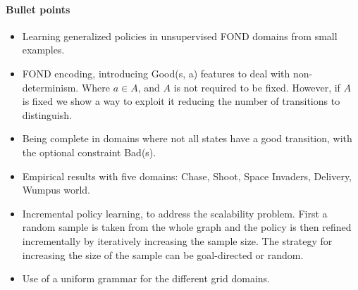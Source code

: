 \documentclass[a4paper]{article}
\begin{document}
\paragraph{Bullet points}
\begin{itemize}
\item Learning generalized policies in unsupervised FOND domains from small examples.
\item FOND encoding, introducing Good(s, a) features to deal with non-determinism. Where $a \in A$, and $A$ is not required to be fixed. However, if $A$ is fixed we show a way to exploit it reducing the number of transitions to distinguish.
\item Being complete in domains where not all states have a good transition, with the optional constraint Bad(s).
\item Empirical results with five domains: Chase, Shoot, Space Invaders, Delivery, Wumpus world.
\item Incremental policy learning, to address the scalability problem. First a random sample is taken from the whole graph and the policy is then refined incrementally by iteratively increasing the sample size. The strategy for increasing the size of the sample can be goal-directed or random.
\item Use of a uniform grammar for the different grid domains.
\end{itemize}




\end{document}
